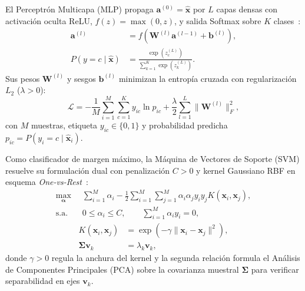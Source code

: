 El Perceptrón Multicapa (MLP) propaga $\mathbf{a}^{(0)} = \hat{\mathbf{x}}$ por $L$ capas densas con activación oculta ReLU, $f(z)=\max(0,z)$, y salida Softmax sobre $K$ clases~\cite{Soualhi2022}:
\begin{equation}
\begin{aligned}
\mathbf{a}^{(l)} &= f\!\left(\mathbf{W}^{(l)}\mathbf{a}^{(l-1)} + \mathbf{b}^{(l)}\right), \\
P(y = c \mid \hat{\mathbf{x}}) &= \frac{\exp\!\left(z_c^{(L)}\right)}{\sum_{k=1}^{K}\exp\!\left(z_k^{(L)}\right)}.
\end{aligned}
\label{eq:mlp_softmax}
\end{equation}
Sus pesos $\mathbf{W}^{(l)}$ y sesgos $\mathbf{b}^{(l)}$ minimizan la entropía cruzada con regularización $L_2$ ($\lambda > 0$):
\begin{equation}
\mathcal{L} = -\frac{1}{M}\sum_{i=1}^{M}\sum_{c=1}^{K} y_{ic}\ln p_{ic} + \frac{\lambda}{2}\sum_{l=1}^{L}\|\mathbf{W}^{(l)}\|_F^2,
\label{eq:entropia_cruzada}
\end{equation}
con $M$ muestras, etiqueta $y_{ic} \in \{0,1\}$ y probabilidad predicha $p_{ic} = P(y_i = c \mid \hat{\mathbf{x}}_i)$.

Como clasificador de margen máximo, la Máquina de Vectores de Soporte (SVM) resuelve su formulación dual con penalización $C > 0$ y kernel Gaussiano RBF en esquema \emph{One-vs-Rest}~\cite{Gangsar2020}:
\begin{equation}
\begin{split}
\max_{\boldsymbol{\alpha}} \;\;& \sum_{i=1}^{M}\alpha_i - \frac{1}{2}\sum_{i=1}^{M}\sum_{j=1}^{M}\alpha_i\alpha_j y_i y_j K(\mathbf{x}_i, \mathbf{x}_j), \\
\text{s.a.} \;\;& 0 \le \alpha_i \le C, \qquad \sum_{i=1}^{M}\alpha_i y_i = 0,
\end{split}
\label{eq:svm_dual}
\end{equation}
\begin{align}
K(\mathbf{x}_i, \mathbf{x}_j) &= \exp\!\left(-\gamma \|\mathbf{x}_i - \mathbf{x}_j\|^2\right), \label{eq:kernel_rbf} \\
\boldsymbol{\Sigma}\mathbf{v}_k &= \lambda_k \mathbf{v}_k, \label{eq:pca_eigen}
\end{align}
donde $\gamma > 0$ regula la anchura del kernel y la segunda relación formula el Análisis de Componentes Principales (PCA) sobre la covarianza muestral $\boldsymbol{\Sigma}$ para verificar separabilidad en ejes $\mathbf{v}_k$.


